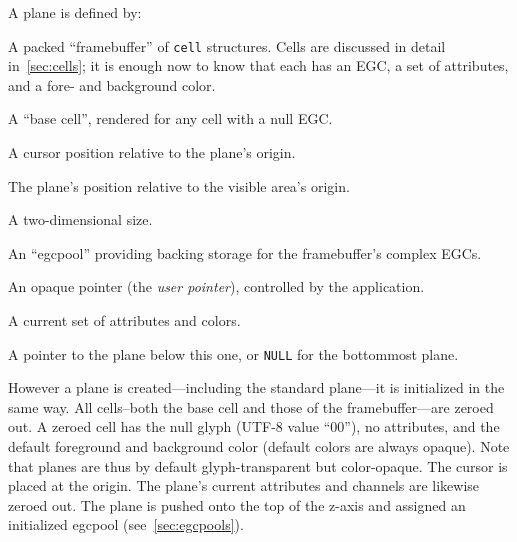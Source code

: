 A plane is defined by:
\begin{denseitemize}
\item{A packed ``framebuffer'' of \texttt{cell} structures. Cells are discussed
    in detail in~\ref{sec:cells}; it is enough now to know that each has an
    EGC, a set of attributes, and a fore- and background color.}
\item{A ``base cell'', rendered for any cell with a null EGC.}
\item{A cursor position relative to the plane's origin.}
\item{The plane's position relative to the visible area's origin.}
\item{A two-dimensional size.}
\item{An ``egcpool'' providing backing storage for the framebuffer's complex EGCs.}
\item{An opaque pointer (the \textit{user pointer}), controlled by the application.}
\item{A current set of attributes and colors.}
\item{A pointer to the plane below this one, or \texttt{NULL} for the bottommost plane.}
\end{denseitemize}

However a plane is created---including the standard plane---it is initialized
in the same way. All cells--both the base cell and those of the
framebuffer---are zeroed out. A zeroed cell has the null glyph (UTF-8
value ``00''), no attributes, and the default foreground and background color
(default colors are always opaque). Note that planes are thus by default
glyph-transparent but color-opaque. The cursor is placed at the origin. The
plane's current attributes and channels are likewise zeroed out. The plane is
pushed onto the top of the z-axis and assigned an initialized egcpool
(see~\ref{sec:egcpools}).

